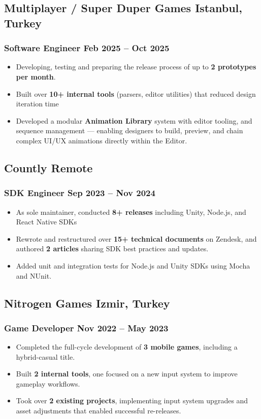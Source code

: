 \documentclass[11pt]{article}
\newcommand{\rside}[1]{
  \hfill {\normalfont\color{accent} #1}%
}
\begin{document}
\subsection{Multiplayer / Super Duper Games \rside{Istanbul, Turkey}}
\subsubsection{Software Engineer \rside{Feb 2025 -- Oct 2025}}
\begin{itemize}
  \item Developing, testing and preparing the release process of up to \textbf{2 prototypes per month}.
  \item Built over \textbf{10+ internal tools} (parsers, editor utilities) that reduced design iteration time
  \item Developed a modular \textbf{Animation Library} system with editor tooling, and sequence management — enabling designers to build, preview, and chain complex UI/UX animations directly within the Editor.
\end{itemize}

\subsection{Countly \rside{Remote}}
\subsubsection{SDK Engineer \rside{Sep 2023 -- Nov 2024}}
\begin{itemize}
  \item As sole maintainer, conducted \textbf{8+ releases} including Unity, Node.js, and React Native SDKs
  \item Rewrote and restructured over \textbf{15+ technical documents} on Zendesk, and authored \textbf{2 articles} sharing SDK best practices and updates.
  \item Added unit and integration tests for Node.js and Unity SDKs using Mocha and NUnit.
\end{itemize}

\subsection{Nitrogen Games \rside{Izmir, Turkey}}
\subsubsection{Game Developer \rside{Nov 2022 -- May 2023}}
\begin{itemize}
  \item Completed the full-cycle development of \textbf{3 mobile games}, including a hybrid-casual title.
  \item Built \textbf{2 internal tools}, one focused on a new input system to improve gameplay workflows.
  \item Took over \textbf{2 existing projects}, implementing input system upgrades and asset adjustments that enabled successful re-releases.
\end{itemize}
\end{document}
